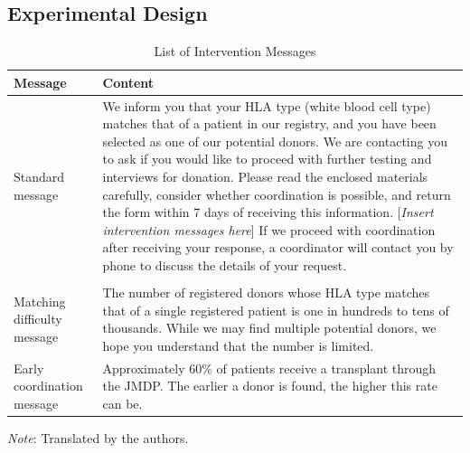 \documentclass[12pt, a4paper]{article}
\begin{document}
\hypertarget{design}{%
\subsection{Experimental Design}\label{design}}

\begin{table}
\centering
\caption{\label{tab:list-message}List of Intervention Messages}
\centering
\fontsize{8}{10}\selectfont
\begin{threeparttable}
\begin{tabular}[t]{l>{\raggedright\arraybackslash}p{40em}}
\toprule
Message & Content\\
\midrule
Standard message & We inform you that your HLA type (white blood cell type) matches that of a patient in our registry, and you have been selected as one of our potential donors. We are contacting you to ask if you would like to proceed with further testing and interviews for donation. Please read the enclosed materials carefully, consider whether coordination is possible, and return the form within 7 days of receiving this information. [\emph{Insert intervention messages here}] If we proceed with coordination after receiving your response, a coordinator will contact you by phone to discuss the details of your request.\\
\addlinespace[0.3em]
\multicolumn{2}{l}{\textbf{Intervention message}}\\
\hspace{1em}Matching difficulty message & The number of registered donors whose HLA type matches that of a single registered patient is one in hundreds to tens of thousands. While we may find multiple potential donors, we hope you understand that the number is limited.\\
\hspace{1em}Early coordination message & Approximately 60\% of patients receive a transplant through the JMDP. The earlier a donor is found, the higher this rate can be.\\
\bottomrule
\end{tabular}
\begin{tablenotes}
\item \emph{Note}: Translated by the authors.
\end{tablenotes}
\end{threeparttable}
\end{table}
\end{document}
